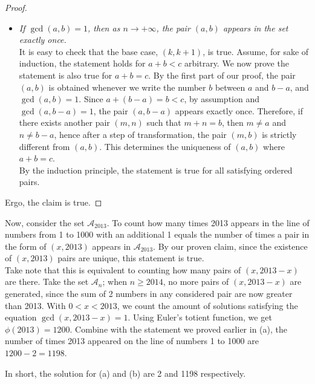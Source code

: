 \documentclass[11pt]{article}
\begin{document}
\begin{solution}
\begin{enumerate}
\begin{proof}
\begin{itemize}
                        \item \textit{If \(\gcd(a,b) = 1\), then as \(n \to +\infty\), the pair \((a,b)\) appears in the set exactly once.}\\
                        It is easy to check that the base case, \((k,k+1)\), is true. Assume, for sake of induction, the statement holds for \(a + b < c\) arbitrary. We now prove the statement is also true for \(a + b = c\). By the first part of our proof, the pair \((a,b)\) is obtained whenever we write the number \(b\) between \(a\) and \(b - a\), and \(\gcd(a,b) = 1\). Since \(a + (b - a) = b < c\), by assumption and \(\gcd(a,b - a) = 1\), the pair \((a,b - a)\) appears exactly once. Therefore, if there exists another pair \((m,n)\) such that \(m + n = b\), then \(m \neq a\) and \(n \neq b - a\), hence after a step of transformation, the pair \((m,b)\) is strictly different from \((a,b)\). This determines the uniqueness of \((a,b)\) where \(a + b = c\).\\
                        By the induction principle, the statement is true for all satisfying ordered pairs.
                    \end{itemize}

                    Ergo, the claim is true.
                \end{proof}
                
                Now, consider the set \(\mathcal{A}_{2013}\). To count how many times 2013 appears in the line of numbers from 1 to 1000 with an additional 1 equals the number of times a pair in the form of \((x,2013)\) appears in \(\mathcal{A}_{2013}\). By our proven claim, since the existence of \((x,2013)\) pairs are unique, this statement is true.\\
                Take note that this is equivalent to counting how many pairs of \((x,2013 - x)\) are there. Take the set \(\mathcal{A}_n\); when \(n \geq 2014\), no more pairs of \((x,2013 - x)\) are generated, since the sum of 2 numbers in any considered pair are now greater than 2013. With \(0 < x < 2013\), we count the amount of solutions satisfying the equation \(\gcd(x,2013 - x) = 1\). Using Euler's totient function, we get \(\phi(2013) = 1200\). Combine with the statement we proved earlier in (a), the number of times 2013 appeared on the line of numbers 1 to 1000 are \(1200 - 2 = 1198\).
            \end{enumerate}
            In short, the solution for (a) and (b) are 2 and 1198 respectively.
        \end{solution}
\end{document}
